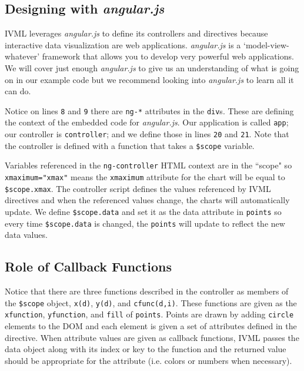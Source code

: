 \documentclass[a4paper,10pt-]{article}
\begin{document}
\subsection{Designing with \emph{angular.js}}

IVML leverages \emph{angular.js} to define its controllers and directives because interactive data visualization are web applications. \emph{angular.js} is a `model-view-whatever' framework that allows you to develop very powerful web applications. We will cover just enough \emph{angular.js} to give us an understanding of what is going on in our example code but we recommend looking into \emph{angular.js} to learn all it can do. 

Notice on lines {\tt 8} and {\tt 9} there are {\tt ng-*} attributes in the {\tt div}s. These are defining the context of the embedded code for \emph{angular.js}. Our application is called {\tt app}; our controller is {\tt controller}; and we define those in lines {\tt 20} and {\tt 21}. Note that the controller is defined with a function that takes a {\tt \$scope} variable. 

Variables referenced in the {\tt ng-controller} HTML context are in the ``scope" so {\tt xmaximum="xmax"} means the {\tt xmaximum} attribute for the chart will be equal to {\tt \$scope.xmax}. The controller script defines the values referenced by IVML directives and when the referenced values change, the charts will automatically update. We define {\tt \$scope.data} and set it as the data attribute in {\tt points} so every time {\tt \$scope.data} is changed, the {\tt points} will update to reflect the new data values.

\subsection{Role of Callback Functions}

Notice that there are three functions described in the controller as members of the {\tt \$scope} object, {\tt x(d)}, {\tt y(d)}, and {\tt cfunc(d,i)}. These functions are given as the {\tt xfunction}, {\tt yfunction}, and {\tt fill} of {\tt points}. Points are drawn by adding {\tt circle} elements to the DOM and each element is given a set of attributes defined in the directive. When attribute values are given as callback functions, IVML passes the data object along with its index or key to the function and the returned value should be appropriate for the attribute (i.e. colors or numbers when necessary). 
\end{document}
